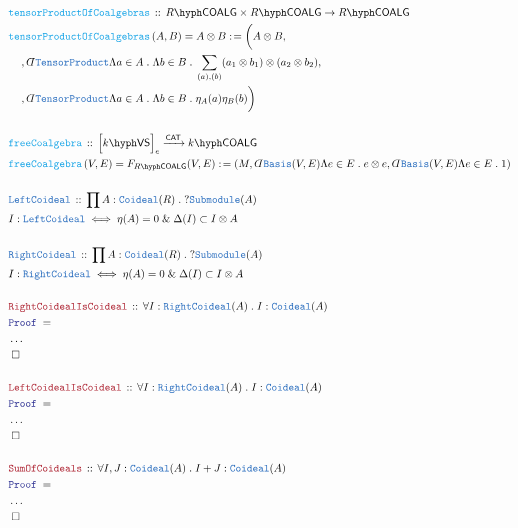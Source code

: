 \documentclass[12pt]{scrartcl}%
\newcommand{\TYPE}[1]{\textcolor{NavyBlue}{\mathtt{#1}}}%
\newcommand{\FUNC}[1]{\textcolor{Cerulean}{\mathtt{#1}}}%
\newcommand{\LOGIC}[1]{\textcolor{Blue}{\mathtt{#1}}}%
\newcommand{\THM}[1]{\textcolor{Maroon}{\mathtt{#1}}}%
\renewcommand{\.}{\; . \;} %
\newcommand{\de}{: \kern 0.1pc =} %
\newcommand{\Act}[1]{\left( #1 \right)} %
\newcommand{\Theorem}[2]{& \THM{#1} \, :: \, #2 \\ & \Proof = \\ } %
\newcommand{\DeclareType}[2]{& \TYPE{#1} \, :: \, #2 \\}%
\newcommand{\DefineType}[3]{& #1 : \TYPE{#2} \iff #3 \\}%
\newcommand{\DeclareFunc}[2]{& \FUNC{#1} \, :: \, #2 \\}%
\newcommand{\DefineNamedFunc}[4]{&  \FUNC{#1}\Act{#2} = #3 \de #4 \\}%
\newcommand{\NewLine}{\\ & \kern 1pc}%
\newcommand{\Page}[1]{ \begin{align*} #1 \end{align*}  }%
\newcommand{ \bd }{ \ByDef }%
\newcommand{\NoProof}{ & \ldots \\ \EndProof}%
\renewcommand{\And}{\; \& \;}%
\newcommand{\QED}{\; \square} %
\newcommand{\EndProof}{& \QED \\} %
\newcommand{\ByDef}{\rotatebox[origin=c]{-180}{$D$}}%
\newcommand{\Proof}{\LOGIC{Proof} \; } %
\newcommand{\Arrow}[1]{\xrightarrow{#1}}%
\newcommand{\CAT}{\mathsf{CAT}} %
\newcommand{\Basis}{\TYPE{Basis}} %
\newcommand{\VS}[1]{#1\hyph\mathsf{VS}} %
\newcommand{\COALG}[1]{#1\hyph\mathsf{COALG}}%
\begin{document}
\Page{
	\DeclareFunc{tensorProductOfCoalgebras}{\COALG{R} \times \COALG{R} \to \COALG{R}}
	\DefineNamedFunc{tensorProductOfCoalgebras}{A,B}{A \otimes B}{  \bigg( A \otimes B, \NewLine, 
		\bd \TYPE{TensorProduct} \Lambda a \in A \. \Lambda b \in B \. \sum_{(a),(b)} (a_1 \otimes b_1) \otimes (a_2 \otimes b_2), \NewLine ,
		\bd \TYPE{TensorProduct} \Lambda a \in A \. \Lambda b \in B \.  \eta_A(a)\eta_B(b)                    
	\bigg)}
	\\
	\DeclareFunc{freeCoalgebra}{ \Big[\VS{k}\Big]_e \Arrow{\CAT} \COALG{k}}
	\DefineNamedFunc{freeCoalgebra}{V,E}{F_{\COALG{R}}(V,E)}{(M,\bd \Basis(V,E)\Lambda e \in E \. e \otimes e, \bd \Basis(V,E)\Lambda e \in E \. 1 ) } 
	\\
	\DeclareType{LeftCoideal}{ \prod A : \TYPE{Coideal}(R) \. ?\TYPE{Submodule}(A)    }
	\DefineType{I}{LeftCoideal}{ \eta(A) = 0 \And  \Delta(I) \subset I \otimes A }
	\\
	\DeclareType{RightCoideal}{\prod A : \TYPE{Coideal}(R) \. ?\TYPE{Submodule}(A)  }
	\DefineType{I}{RightCoideal}{\eta(A) = 0 \And \Delta(I) \subset I \otimes A }
	\\
	\Theorem{RightCoidealIsCoideal}{\forall I : \TYPE{RightCoideal}(A) \.  I : \TYPE{Coideal}(A)}
	\NoProof
	\\
	\Theorem{LeftCoidealIsCoideal}{\forall I : \TYPE{RightCoideal}(A) \. I : \TYPE{Coideal}(A)}
	\NoProof
	\\
	\Theorem{SumOfCoideals}{\forall I,J : \TYPE{Coideal}(A) \. I + J : \TYPE{Coideal}(A)}
	\NoProof
}
\newpage
\end{document}
